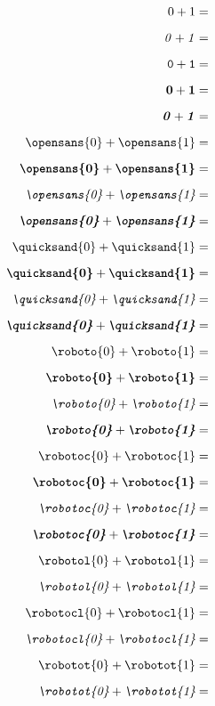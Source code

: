 \documentclass[a4paper,12pt]{article}
\begin{document}
\begin{multicols}{5}
\noindent
\begin{align*}
\mathrm{0}+\mathrm{1}&=\\[0.6em]
\mathit{0}+\mathit{1}&=\\[0.6em]
\mathtt{0}+\mathtt{1}&=\\[0.6em]
\mathbf{0}+\mathbf{1}&=\\[0.6em]
\textbf{\textit{0}}+\textbf{\textit{1}}&=\\[0.6em]
\textrm{\opensans{0}}+\textrm{\opensans{1}}&=\\[0.6em]
\textbf{\opensans{0}}+\textbf{\opensans{1}}&=\\[0.6em]
\textit{\opensans{0}}+\textit{\opensans{1}}&=\\[0.6em]
\textbf{\textit{\opensans{0}}}+\textbf{\textit{\opensans{1}}}&=\\[0.6em]
\textrm{\quicksand{0}}+\textrm{\quicksand{1}}&=\\[0.6em]
\textbf{\quicksand{0}}+\textbf{\quicksand{1}}&=\\[0.6em]
\textit{\quicksand{0}}+\textit{\quicksand{1}}&=\\[0.6em]
\textbf{\textit{\quicksand{0}}}+\textbf{\textit{\quicksand{1}}}&=\\[0.6em]
\textrm{\roboto{0}}+\textrm{\roboto{1}}&=\\[0.6em]
\textbf{\roboto{0}}+\textbf{\roboto{1}}&=\\[0.6em]
\textit{\roboto{0}}+\textit{\roboto{1}}&=\\[0.6em]
\textbf{\textit{\roboto{0}}}+\textbf{\textit{\roboto{1}}}&=\\[0.6em]
\textrm{\robotoc{0}}+\textrm{\robotoc{1}}&=\\[0.6em]
\textbf{\robotoc{0}}+\textbf{\robotoc{1}}&=\\[0.6em]
\textit{\robotoc{0}}+\textit{\robotoc{1}}&=\\[0.6em]
\textbf{\textit{\robotoc{0}}}+\textbf{\textit{\robotoc{1}}}&=\\[0.6em]
\textrm{\robotol{0}}+\textrm{\robotol{1}}&=\\[0.6em]
\textit{\robotol{0}}+\textit{\robotol{1}}&=\\[0.6em]
\textrm{\robotocl{0}}+\textrm{\robotocl{1}}&=\\[0.6em]
\textit{\robotocl{0}}+\textit{\robotocl{1}}&=\\[0.6em]
\textrm{\robotot{0}}+\textrm{\robotot{1}}&=\\[0.6em]
\textit{\robotot{0}}+\textit{\robotot{1}}&=\\[0.6em]

\end{align*}
\end{multicols}
\end{document}
